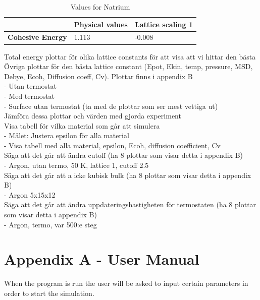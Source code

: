 \documentclass[12pt,a4paper]{article}
\begin{document}
\begin{center}
\begin{table}[h]
\caption{Values for Natrium}
\begin{tabular}{| l | l | l |}
\hline
  & \textbf{Physical values} & \textbf{Lattice scaling 1} \\
\hline
\textbf{Cohesive Energy} & 1.113 & -0.008 \\
\hline
\end{tabular}
\end{table} 
\end{center}


Total energy plottar för olika lattice constants för att visa att vi hittar den bästa\\
Övriga plottar för den bästa lattice constant (Epot, Ekin, temp, pressure, MSD, Debye, Ecoh, Diffusion coeff, Cv). Plottar finns i appendix B\\
	- Utan termostat\\
	- Med termostat\\
	- Surface utan termostat (ta med de plottar som ser mest vettiga ut)\\
Jämföra dessa plottar och värden med gjorda experiment\\
Visa tabell för vilka material som går att simulera\\
	- Målet: Justera epsilon för alla material\\
	- Visa tabell med alla material, epsilon, Ecoh, diffusion coefficient, Cv\\
Säga att det går att ändra cutoff (ha 8 plottar som visar detta i appendix B)\\
	- Argon, utan termo, 50 K, lattice 1, cutoff 2.5\\
Säga att det går att a icke kubisk bulk (ha 8 plottar som visar detta i appendix B)\\
	- Argon 5x15x12\\
Säga att det går att ändra uppdateringshastigheten för termostaten (ha 8 plottar som visar detta i appendix B)\\
	- Argon, termo, var 500:e steg\\

\newpage

\section*{Appendix A - User Manual}

\label{sec:AppendixA}
When the program is run the user will be asked to input certain parameters in order to start the simulation.
\end{document}
